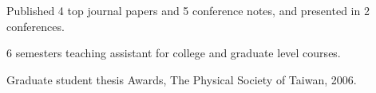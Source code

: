 \documentclass[letterpaper]{deedy-resume-openfont}
\begin{document}
\begin{tightemize}
\item Published 4 top journal papers and 5 conference notes, and presented in 2 conferences.
\item 6 semesters teaching assistant for college and graduate level courses.
\end{tightemize}
\sectionsep

\begin{tightemize}
\item Graduate student thesis Awards, The Physical Society of Taiwan, 2006.
\end{tightemize}
\sectionsep

\end{document}
